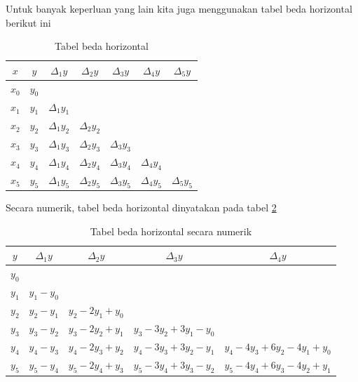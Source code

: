 Untuk banyak keperluan yang lain kita juga menggunakan tabel beda horizontal berikut ini

\begin{table}[!htbp]
\centering
\caption{Tabel beda horizontal}
\label{tabel:BedaHorizontal}
\begin{tabular}{@{}|c|c|c|c|c|c|c|@{}}
\hline
$x$	& $y$	& $\Delta_1 y$		& $\Delta_2 y$		& $\Delta_3 y$		& $\Delta_4 y$		& $\Delta_5 y$		\\ \hline
$x_0$	& $y_0$	&  			& 			& 			&			& 			\\
$x_1$	& $y_1$	& $\Delta_1 y_1$	&			& 			& 			& 			\\
$x_2$	& $y_2$	& $\Delta_1 y_2$	& $\Delta_2 y_2$	& 			& 			& 			\\
$x_3$	& $y_3$	& $\Delta_1 y_3$	& $\Delta_2 y_3$	& $\Delta_3 y_3$	& 			& 			\\
$x_4$	& $y_4$	& $\Delta_1 y_4$	& $\Delta_2 y_4$	& $\Delta_3 y_4$	& $\Delta_4 y_4$	& 			\\
$x_5$	& $y_5$	& $\Delta_1 y_5$	& $\Delta_2 y_5$	& $\Delta_3 y_5$	& $\Delta_4 y_5$	& $\Delta_5 y_5$	\\ \hline
\end{tabular}
\end{table}

Secara numerik, tabel beda horizontal dinyatakan pada tabel \ref{tabel:BedaHorizontalNumerik}

\begin{table}[!htbp]
\centering
\caption{Tabel beda horizontal secara numerik}
\label{tabel:BedaHorizontalNumerik}
\begin{tabular}{@{}|c|c|c|c|c|@{}}
\hline
$y$	& $\Delta_1 y$	& $\Delta_2 y$		& $\Delta_3 y$			& $\Delta_4 y$				\\[1ex] \hline
$y_0$	& 		&  			& 				&					\\[1ex]
$y_1$	& $y_1 - y_0$	& 			&				&					\\[1ex]
$y_2$	& $y_2 - y_1$	& $y_2 - 2y_1 + y_0$	& 				&					\\[1ex]
$y_3$	& $y_3 - y_2$	& $y_3 - 2y_2 + y_1$	& $y_3 - 3y_2 + 3y_1 - y_0$	&					\\[1ex]
$y_4$	& $y_4 - y_3$	& $y_4 - 2y_3 + y_2$	& $y_4 - 3y_3 + 3y_2 - y_1$	& $y_4 - 4y_3 + 6y_2 - 4y_1 + y_0$	\\[1ex]
$y_5$	& $y_5 - y_4$	& $y_5 - 2y_4 + y_3$	& $y_5 - 3y_4 + 3y_3 - y_2$	& $y_5 - 4y_4 + 6y_3 - 4y_2 + y_1$	\\[1ex] \hline
\end{tabular}
\end{table}

